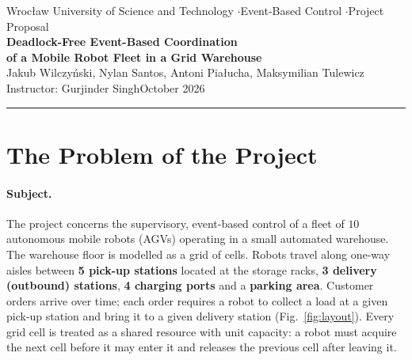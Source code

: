 \documentclass[11pt,a4paper]{article}
\newcommand{\PA}{Jakub Wilczyński}   %
\newcommand{\PB}{Nylan Santos}
\newcommand{\PC}{Antoni Piałucha}
\newcommand{\PD}{Maksymilian Tulewicz}
\newcommand{\Instructor}{Gurjinder Singh}
\begin{document}
\begin{center}
  {\small Wrocław University of Science and Technology \quad$\cdot$\quad Event-Based Control \quad$\cdot$\quad Project Proposal}\\[10pt]
  {\LARGE\bfseries Deadlock-Free Event-Based Coordination\\[3pt] of a Mobile Robot Fleet in a Grid Warehouse}\\[10pt]
  {\normalsize \PA{}, \PB{}, \PC{}, \PD{}}\\[3pt]
  {\small Instructor: \Instructor \qquad October 2026}
\end{center}
\vspace{4pt}
\hrule
\vspace{6pt}

\section{The Problem of the Project}

\paragraph{Subject.}
The project concerns the supervisory, event-based control of a fleet of
$10$ autonomous mobile robots (AGVs) operating in a small automated
warehouse. The warehouse floor is modelled as a grid of cells. Robots
travel along one-way aisles between \textbf{5 pick-up stations} located
at the storage racks, \textbf{3 delivery (outbound) stations},
\textbf{4 charging ports} and a \textbf{parking area}. Customer orders
arrive over time; each order requires a robot to collect a load at a
given pick-up station and bring it to a given delivery station
(Fig.~\ref{fig:layout}). Every grid cell is treated as a shared
resource with unit capacity: a robot must acquire the next cell before it
may enter it and releases the previous cell after leaving it.
\end{document}
